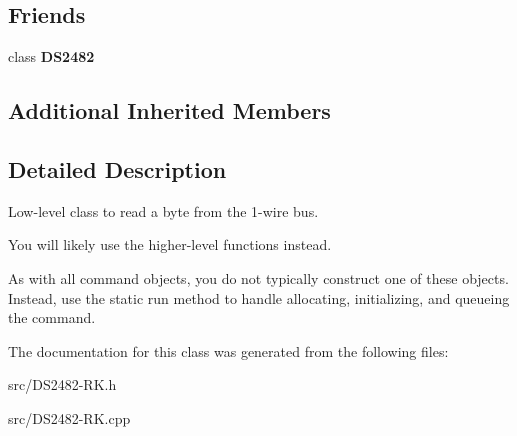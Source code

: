 \subsection*{Friends}
\begin{DoxyCompactItemize}
\item 
\mbox{\label{class_d_s24821_wire_read_byte_afeaf69274324e8dbeebede05c02d9c18}} 
class {\bfseries D\+S2482}
\end{DoxyCompactItemize}
\subsection*{Additional Inherited Members}


\subsection{Detailed Description}
Low-\/level class to read a byte from the 1-\/wire bus. 

You will likely use the higher-\/level functions instead.

As with all command objects, you do not typically construct one of these objects. Instead, use the static run method to handle allocating, initializing, and queueing the command. 

The documentation for this class was generated from the following files\+:\begin{DoxyCompactItemize}
\item 
src/D\+S2482-\/\+R\+K.\+h\item 
src/D\+S2482-\/\+R\+K.\+cpp\end{DoxyCompactItemize}
